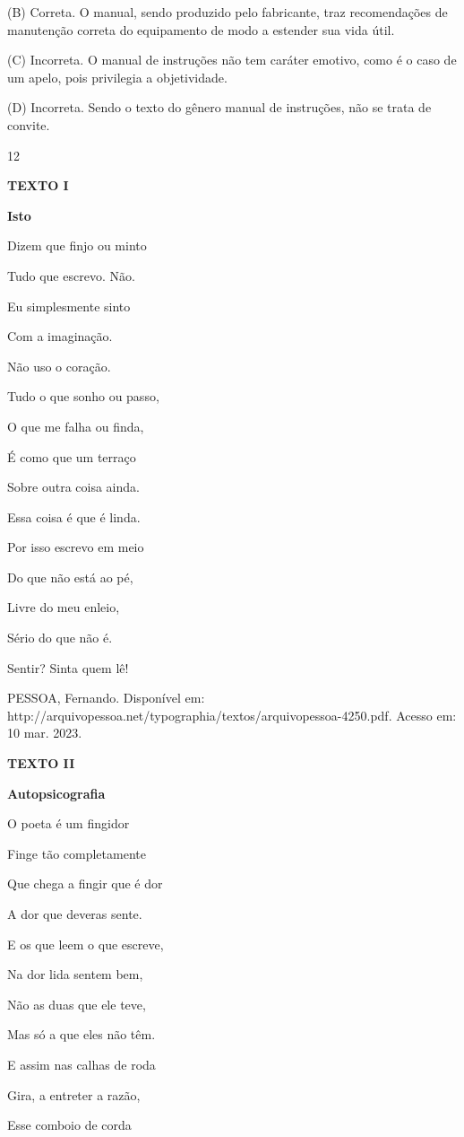 (B) Correta. O manual, sendo produzido pelo fabricante, traz
recomendações de manutenção correta do equipamento de modo a estender
sua vida útil.

(C) Incorreta. O manual de instruções não tem caráter emotivo, como é o
caso de um apelo, pois privilegia a objetividade.

(D) Incorreta. Sendo o texto do gênero manual de instruções, não se
trata de convite.

\num{12}

\textbf{TEXTO I}

\textbf{Isto}

Dizem que finjo ou minto

Tudo que escrevo. Não.

Eu simplesmente sinto

Com a imaginação.

Não uso o coração.

Tudo o que sonho ou passo,

O que me falha ou finda,

É como que um terraço

Sobre outra coisa ainda.

Essa coisa é que é linda.

Por isso escrevo em meio

Do que não está ao pé,

Livre do meu enleio,

Sério do que não é.

Sentir? Sinta quem lê!

PESSOA, Fernando. Disponível em:
http://arquivopessoa.net/typographia/textos/arquivopessoa-4250.pdf.
Acesso em: 10 mar. 2023.

\textbf{TEXTO II}

\textbf{Autopsicografia}

O poeta é um fingidor

Finge tão completamente

Que chega a fingir que é dor

A dor que deveras sente.

E os que leem o que escreve,

Na dor lida sentem bem,

Não as duas que ele teve,

Mas só a que eles não têm.

E assim nas calhas de roda

Gira, a entreter a razão,

Esse comboio de corda

